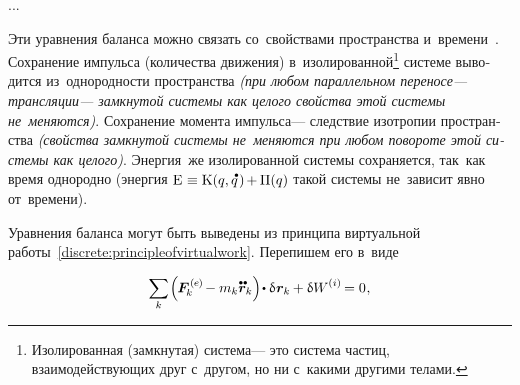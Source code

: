 \begin{otherlanguage}{russian}
...




Эти уравнения баланса можно связать со~свойствами пространства и~времени~\cite{landau.lifshitz-shortcourse}. Сохранение импульса (количества движения) в~изолированной\footnote{Изолированная (замкнутая) система\:--- это система частиц, взаимодействующих друг с~другом, но ни с~какими другими телами.}\hspace{-0.25ex} системе выводится из~однородности пространства \emph{(при любом параллельном переносе\:--- трансляции\:--- замкнутой системы как целого свойства этой системы не~меняются)}. Сохранение момента импульса\:--- следствие изотропии пространства \emph{(свойства замкнутой системы не~меняются при любом повороте этой системы как целого)}. Энергия~же изолированной системы сохраняется, так~как время однородно (энергия ${\mathrm{E} \hspace{.1ex} \equiv \kinetic \hspace{.1ex} (q, \mathdotabove{q} \hspace{.2ex}) \hspace{-0.2ex} + \hspace{-0.1ex} \potential(q)}$ такой системы не~зависит явно от~времени).

Уравнения баланса могут быть выведены из принципа виртуальной работы~\eqref{discrete:principleofvirtualwork}.
Перепишем его в~виде

\nopagebreak\vspace{-0.2em}\begin{equation}\label{discrete:principleofvirtualwork.externalinternal}
\displaystyle \sum_{\smash{k}} \hspace{-0.2ex} \left(^{\mathstrut} \hspace{-0.25ex} \bm{F}^{\smthexternal}_{\hspace{-0.16ex}k} \hspace{-0.1ex} - m_k \mathdotdotabove{\locationvector}_k \right) \hspace{-0.32ex} \dotp \variation{\hspace{.1ex}\locationvector_k} \hspace{-0.1ex}
+ \variation{\internalwork} \hspace{-0.1ex} = 0 \hspace{.1ex},
\vspace{-0.25em}\end{equation}


\end{otherlanguage}
